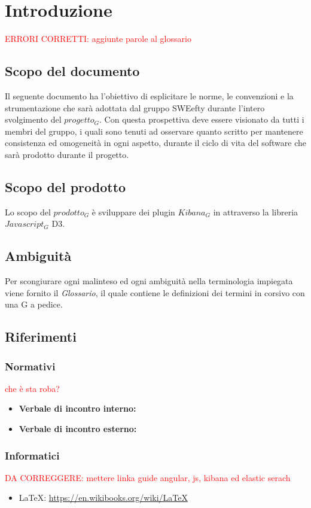 \section{Introduzione}
\textcolor{red}{ERRORI CORRETTI: aggiunte parole al glossario}
\subsection{Scopo del documento}
Il seguente documento ha l'obiettivo di esplicitare le norme, le convenzioni e la strumentazione che sarà adottata dal gruppo SWEefty durante l'intero svolgimento del $progetto_G$. Con questa prospettiva deve essere visionato da tutti i membri del gruppo, i quali sono tenuti ad osservare quanto scritto per mantenere consistenza ed omogeneità in ogni aspetto, durante il ciclo di vita del software che sarà prodotto durante il progetto.
\subsection{Scopo del prodotto}
Lo scopo del $prodotto_G$ è sviluppare dei plugin $Kibana_G$ in attraverso la libreria $Javascript_G$ D3.

\subsection{Ambiguità}
Per scongiurare ogni malinteso ed ogni ambiguità nella terminologia impiegata viene fornito il \textit{Glossario}, il quale contiene le definizioni dei termini in corsivo con una G a pedice.

\subsection{Riferimenti}
	\subsubsection{Normativi}
	\textcolor{red}{che è sta roba?}
		\begin{itemize}
			\item \textbf{Verbale di incontro interno:}
			\item \textbf{Verbale di incontro esterno:}		
		\end{itemize}
	\subsubsection{Informatici}
	\textcolor{red}{DA CORREGGERE: mettere linka  guide angular, js, kibana ed elastic serach}
	\begin{itemize}
		\item \LaTeX:  \href{https://en.wikibooks.org/wiki/LaTeX}{https://en.wikibooks.org/wiki/LaTeX}
	\end{itemize}
	